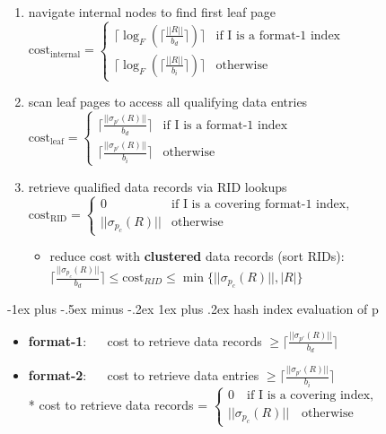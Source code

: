 \documentclass[10pt, landscape]{article}
\makeatletter
\renewcommand{\subsubsection}{\@startsection{subsubsection}{3}{0mm}%
  {-1ex plus -.5ex minus -.2ex}%
  {1ex plus .2ex}%
{\normalfont\small\bfseries}}%
\makeatother
\begin{document}
\begin{multicols*}{4}
  \begin{enumerate}
    \item navigate internal nodes to find first leaf page
      \( {\displaystyle{ 
          \text{cost}_{\text{internal}}=
          \begin{cases}
            \lceil \log_F ( \lceil \frac{||R||}{b_d} \rceil )\rceil &\text{if $$I$$ is a format-1 index}\\
            \lceil \log_F ( \lceil 
            \frac{||R||}{b_i} \rceil )\rceil  &\text{otherwise}
          \end{cases}
      }} \) 
    \item scan leaf pages to access all qualifying data entries
      \( {\displaystyle{ 
          \text{cost}_{\text{leaf}}=
          \begin{cases}
            \lceil \frac{||\sigma_{p'}(R)||}{b_d} \rceil &\text{if $$I$$ is a format-1 index}\\
            \lceil \frac{||\sigma_{p'}(R)||}{b_i} \rceil &\text{otherwise}
          \end{cases}
      }} \) 
    \item retrieve qualified data records via RID lookups
      \( {\displaystyle{ 
          \text{cost}_{\text{RID}}=
          \begin{cases}
            0 &\text{if $$I$$ is a covering format-1 index,}\\
            ||\sigma_{p_c}(R)||  &\text{otherwise}
          \end{cases}
      }} \) 
      \begin{itemize}
        \item reduce cost with \textbf{clustered} data records (sort RIDs): 
          $\lceil\frac{||\sigma_{p_c}(R)||}{b_d}\rceil \leq \text{cost}_{RID} \leq \min\{||\sigma_{p_c}(R)||, |R|\}$
      \end{itemize}
  \end{enumerate}

  \subsubsection{hash index evaluation of p}

  \begin{itemize}
    \item \textbf{format-1}: $\quad$ cost to retrieve data records $ \geq \lceil\frac{||\sigma_{p'}(R)||}{b_d}\rceil $
    \item \textbf{format-2}: $\quad$ cost to retrieve data entries $ \geq \lceil\frac{||\sigma_{p'}(R)||}{b_i}\rceil $ 
      \\* cost to retrieve data records = $ \begin{cases} 0 \quad \text{if $$I$$ is a covering index,}\\
        ||\sigma_{p_c}(R)||  \quad \text{otherwise}
      \end{cases} $
  \end{itemize}



\end{multicols*}
\end{document}
